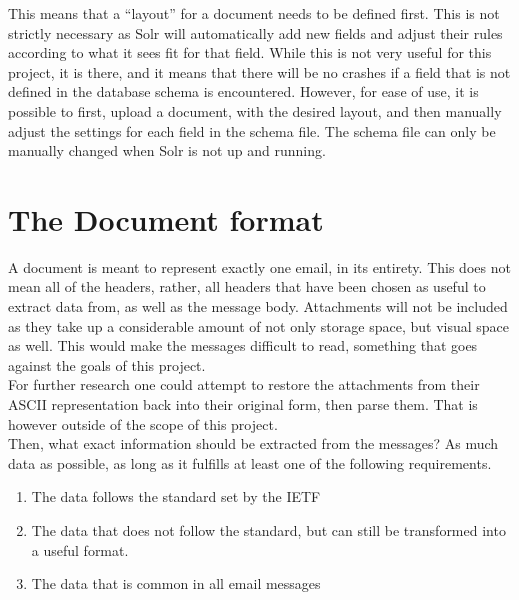 \documentclass[a4paper,english]{report}
\begin{document}
This means that a “layout” for a document needs to be defined first. This is not strictly necessary as Solr will automatically add new fields and adjust their rules according to what it sees fit for that field. While this is not very useful for this project, it is there, and it means that there will be no crashes if a field that is not defined in the database schema is encountered. However, for ease of use, it is possible to first, upload a document, with the desired layout, and then manually adjust the settings for each field in the schema file. The schema file can only be manually changed when Solr is not up and running.





\section{The Document format}

A document is meant to represent exactly one email, in its entirety. This does not mean all of the headers, rather, all headers that have been chosen as useful to extract data from, as well as the message body. Attachments will not be included as they take up a considerable amount of not only storage space, but visual space as well. This would make the messages difficult to read, something that goes against the goals of this project. \\

For further research one could attempt to restore the attachments from their ASCII representation back into their original form, then parse them. That is however outside of the scope of this project.\\

Then, what exact information should be extracted from the messages?
As much data as possible, as long as it fulfills at least one of the following requirements.

\begin{enumerate}

\item The data follows the standard set by the IETF

\item The data that does not follow the standard, but can still be transformed into a useful format. 

\item The data that is common in all email messages


\end{enumerate}
\end{document}
